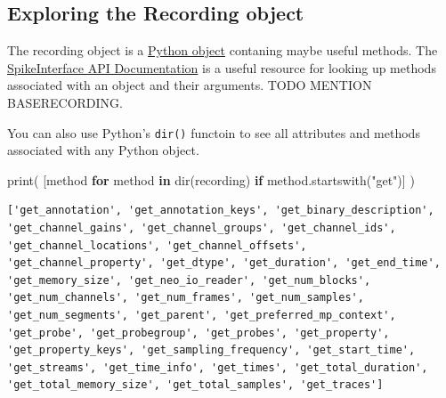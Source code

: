 \documentclass[
  letterpaper,
  DIV=11,
  numbers=noendperiod]{scrreprt}
\newenvironment{Shaded}{\begin{snugshade}}{\end{snugshade}}
\newcommand{\BuiltInTok}[1]{\textcolor[rgb]{0.00,0.23,0.31}{#1}}
\newcommand{\ControlFlowTok}[1]{\textcolor[rgb]{0.00,0.23,0.31}{\textbf{#1}}}
\newcommand{\KeywordTok}[1]{\textcolor[rgb]{0.00,0.23,0.31}{\textbf{#1}}}
\newcommand{\NormalTok}[1]{\textcolor[rgb]{0.00,0.23,0.31}{#1}}
\newcommand{\StringTok}[1]{\textcolor[rgb]{0.13,0.47,0.30}{#1}}
\begin{document}
\subsection*{Exploring the Recording
object}\label{exploring-the-recording-object}

The recording object is a
\href{https://www.reddit.com/r/learnprogramming/comments/uekqvv/comment/i6ns974/?utm_source=share&utm_medium=web3x&utm_name=web3xcss&utm_term=1&utm_content=share_button}{Python
object} contaning maybe useful methods. The
\href{https://spikeinterface.readthedocs.io/en/latest/api.html}{SpikeInterface
API Documentation} is a useful resource for looking up methods
associated with an object and their arguments. TODO MENTION
BASERECORDING.

You can also use Python's \texttt{dir()} functoin to see all attributes
and methods associated with any Python object.

\begin{Shaded}
\begin{Highlighting}[]
\BuiltInTok{print}\NormalTok{(}
\NormalTok{    [method }\ControlFlowTok{for}\NormalTok{ method }\KeywordTok{in} \BuiltInTok{dir}\NormalTok{(recording) }\ControlFlowTok{if}\NormalTok{ method.startswith(}\StringTok{"get"}\NormalTok{)]}
\NormalTok{)}
\end{Highlighting}
\end{Shaded}

\begin{verbatim}
['get_annotation', 'get_annotation_keys', 'get_binary_description', 'get_channel_gains', 'get_channel_groups', 'get_channel_ids', 'get_channel_locations', 'get_channel_offsets', 'get_channel_property', 'get_dtype', 'get_duration', 'get_end_time', 'get_memory_size', 'get_neo_io_reader', 'get_num_blocks', 'get_num_channels', 'get_num_frames', 'get_num_samples', 'get_num_segments', 'get_parent', 'get_preferred_mp_context', 'get_probe', 'get_probegroup', 'get_probes', 'get_property', 'get_property_keys', 'get_sampling_frequency', 'get_start_time', 'get_streams', 'get_time_info', 'get_times', 'get_total_duration', 'get_total_memory_size', 'get_total_samples', 'get_traces']
\end{verbatim}
\end{document}
